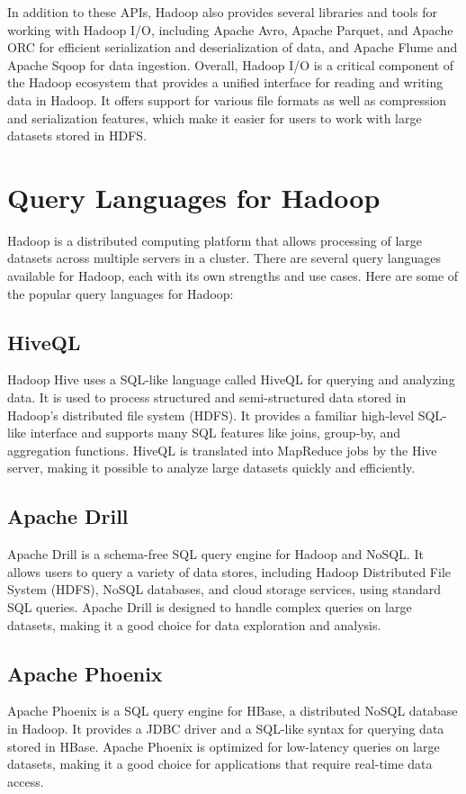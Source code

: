 \documentclass[12pt]{article}
\begin{document}
In addition to these APIs, Hadoop also provides several libraries and tools for working with Hadoop I/O, including Apache Avro, Apache Parquet, and Apache ORC for efficient serialization and deserialization of data, and Apache Flume and Apache Sqoop for data ingestion. Overall, Hadoop I/O is a critical component of the Hadoop ecosystem that provides a unified interface for reading and writing data in Hadoop. It offers support for various file formats as well as compression and serialization features, which make it easier for users to work with large datasets stored in HDFS.

\section{Query Languages for Hadoop}
Hadoop is a distributed computing platform that allows processing of large datasets across multiple servers in a cluster. There are several query languages available for Hadoop, each with its own strengths and use cases.
Here are some of the popular query languages for Hadoop:
\subsection{HiveQL}
Hadoop Hive uses a SQL-like language called HiveQL for querying and analyzing data. It is used to process structured and semi-structured data stored in Hadoop's distributed file system (HDFS). It provides a familiar high-level SQL-like interface and supports many SQL features like joins, group-by, and aggregation functions. HiveQL is translated into MapReduce jobs by the Hive server, making it possible to analyze large datasets quickly and efficiently.
\subsection{Apache Drill}
Apache Drill is a schema-free SQL query engine for Hadoop and NoSQL. It allows users to query a variety of data stores, including Hadoop Distributed File System (HDFS), NoSQL databases, and cloud storage services, using standard SQL queries. Apache Drill is designed to handle complex queries on large datasets, making it a good choice for data exploration and analysis.
\subsection{Apache Phoenix}
Apache Phoenix is a SQL query engine for HBase, a distributed NoSQL database in Hadoop. It provides a JDBC driver and a SQL-like syntax for querying data stored in HBase. Apache Phoenix is optimized for low-latency queries on large datasets, making it a good choice for applications that require real-time data access.
\end{document}
